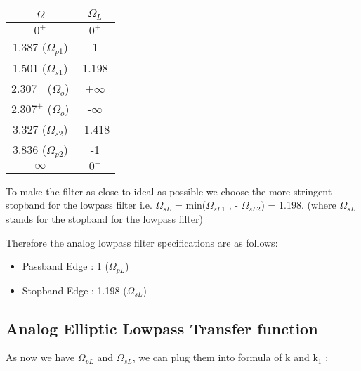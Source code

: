 \documentclass{article}
\begin{document}
\begin{table}[H]
		\begin{center}
		\begin{tabular}{|c|c|}
			\hline
			$\Omega$ & $\Omega_L$\\
			
			\hline
                $0^{+}$ & $0^{+}$\\
                \hline
                1.387 ($\Omega_{p1}$) & 1 \\
                \hline
                1.501 ($\Omega_{s1}$) & 1.198\\
                \hline
                $2.307^{-}$ ($\Omega_o$) & +$\infty$\\
                \hline
                 $2.307^{+}$ ($\Omega_o$) & -$\infty$\\
                \hline
                3.327 ($\Omega_{s2}$)  & -1.418\\
                \hline
                3.836 ($\Omega_{p2}$) & -1\\
                \hline
                $\infty$ & $0^{-}$\\
                \hline
            
		\end{tabular}
		\end{center}
\end{table}

\vspace{1em}
\noindent
To make the filter as close to ideal as possible we choose the more stringent stopband for the lowpass filter i.e. $\Omega_{sL}$ = min($\Omega_{sL1}$ , - $\Omega_{sL2}$) = 1.198. (where $\Omega_{sL}$ stands for the stopband for the lowpass filter)

\vspace{1em}
\noindent
Therefore the analog lowpass filter specifications are as follows:
\begin{itemize}
    \item Passband Edge : 1 ($\Omega_{pL}$)
    \item Stopband Edge : 1.198 ($\Omega_{sL}$)
\end{itemize}

\subsection{Analog Elliptic Lowpass Transfer function}
As now we have $\Omega_{pL}$ and $\Omega_{sL}$, we can plug them into formula of k and k$_1$ :
\end{document}
